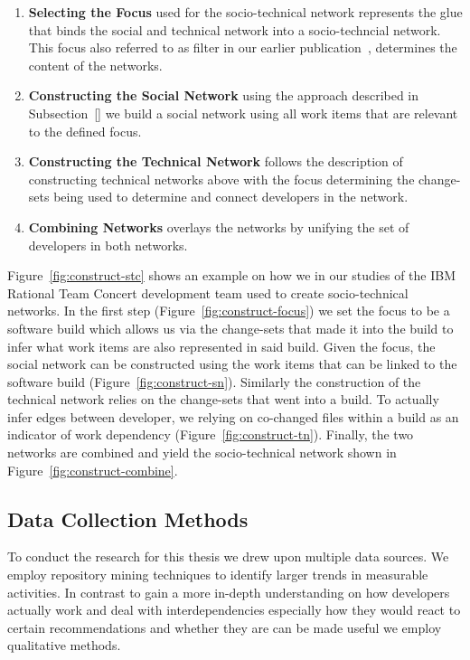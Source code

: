 \begin{enumerate}
\item\textbf{Selecting the Focus} used for the socio-technical network represents the glue that binds the social and technical network into a socio-techncial network. 
This focus also referred to as filter in our earlier publication~\cite{wolf:ieee:2009}, determines the content of the networks.
\item\textbf{Constructing the Social Network} using the approach described in Subsection~\ref{} we build a social network using all work items that are relevant to the defined focus.
\item\textbf{Constructing the Technical Network} follows the description of constructing technical networks above with the focus determining the change-sets being used to determine and connect developers in the network.
\item\textbf{Combining Networks} overlays the networks by unifying the set of developers in both networks.
\end{enumerate}

Figure~\ref{fig:construct-stc} shows an example on how we in our studies of the IBM Rational Team Concert development team used to create socio-technical networks.
In the first step (Figure~\ref{fig:construct-focus}) we set the focus to be a software build which allows us via the change-sets that made it into the build to infer what work items are also represented in said build.
Given the focus, the social network can be constructed using the work items that can be linked to the software build (Figure~\ref{fig:construct-sn}).
Similarly the construction of the technical network relies on the change-sets that went into a build. 
To actually infer edges between developer, we relying on co-changed files within a build as an indicator of work dependency (Figure~\ref{fig:construct-tn}).
Finally, the two networks are combined and yield the socio-technical network shown in Figure~\ref{fig:construct-combine}.

\subsection{Data Collection Methods}
\label{c5:sec:datacollection}
To conduct the research for this thesis we drew upon multiple data sources.
We employ repository mining techniques to identify larger trends in measurable activities.
In contrast to gain a more in-depth understanding on how developers actually work and deal with interdependencies especially how they would react to certain recommendations and whether they are can be made useful we employ qualitative methods.

